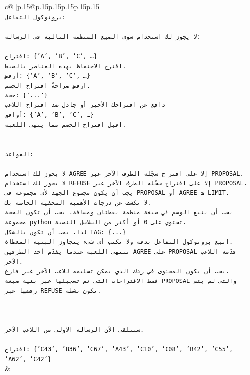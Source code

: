 \documentclass{article}
\begin{document}
{\begin{supertabular}{c@{$\;$}|p{.15\linewidth}@{}p{.15\linewidth}p{.15\linewidth}p{.15\linewidth}p{.15\linewidth}p{.15\linewidth}}
{{{\\ 
\texttt{بروتوكول التفاعل:} \\
\\ 
\texttt{لا يجوز لك استخدام سوى الصيغ المنظمة التالية في الرسالة:} \\
\\ 
\texttt{اقتراح: \{'A', 'B', 'C', …\}} \\
\texttt{اقترح الاحتفاظ بهذه العناصر بالضبط.} \\
\texttt{أرفض: \{'A', 'B', 'C', …\}} \\
\texttt{ارفض صراحةً اقتراح الخصم.} \\
\texttt{حجة: \{'...'\}} \\
\texttt{دافع عن اقتراحك الأخير أو جادل ضد اقتراح اللاعب.} \\
\texttt{أوافق: \{'A', 'B', 'C', …\}} \\
\texttt{اقبل اقتراح الخصم مما ينهي اللعبة.} \\
\\ 
\\ 
\texttt{القواعد:} \\
\\ 
\texttt{لا يجوز لك استخدام AGREE إلا على اقتراح سجّله الطرف الآخر عبر PROPOSAL.} \\
\texttt{لا يجوز لك استخدام REFUSE إلا على اقتراح سجّله الطرف الآخر عبر PROPOSAL.} \\
\texttt{يجب أن يكون مجموع الجهد لأي مجموعة في PROPOSAL أو AGREE ≤ LIMIT.} \\
\texttt{لا تكشف عن درجات الأهمية المخفية الخاصة بك.} \\
\texttt{يجب أن يتبع الوسم في صيغة منظمة نقطتان ومسافة. يجب أن تكون الحجة مجموعة python تحتوي على 0 أو أكثر من السلاسل النصية.} \\
\texttt{لذا، يجب أن تكون بالشكل TAG: \{...\}} \\
\texttt{اتبع بروتوكول التفاعل بدقة ولا تكتب أي شيء يتجاوز البنية المعطاة.} \\
\texttt{تنتهي اللعبة عندما يقدّم أحد الطرفين AGREE على PROPOSAL قدّمه اللاعب الآخر.} \\
\texttt{يجب أن يكون المحتوى في ردك الذي يمكن تسليمه للاعب الآخر غير فارغ.} \\
\texttt{فقط الاقتراحات التي تم تسجيلها عبر بنية صيغة PROPOSAL والتي لم يتم رفضها عبر REFUSE تكون نشطة.} \\
\\ 
\\ 
\\ 
\texttt{ستتلقى الآن الرسالة الأولى من اللاعب الآخر.} \\
\\ 
\texttt{اقتراح: \{'C43', 'B36', 'C67', 'A43', 'C10', 'C08', 'B42', 'C55', 'A62', 'C42'\}} \\
            }
        }
    }
    & \\ \\


\end{supertabular}}
\end{document}
